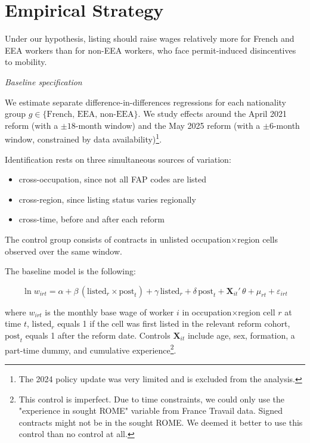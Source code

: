 \documentclass[10pt, a4paper]{article}
\begin{document}
\section{Empirical Strategy}
\medskip

Under our hypothesis, listing should raise wages relatively more for French and EEA workers than for non-EEA workers, who face permit-induced disincentives to mobility.
\medskip

\noindent \textit{Baseline specification}

\noindent We estimate separate difference-in-differences regressions for each nationality group $g \in \{\text{French, EEA, non-EEA}\}$. We study effects around the April 2021 reform (with a $\pm 18$-month window) and the May 2025 reform (with a $\pm 6$-month window, constrained by data availability)\footnote{The 2024 policy update was very limited and is excluded from the analysis.}.

\noindent Identification rests on three simultaneous sources of variation: 
\begin{itemize}
    \item cross-occupation, since not all FAP codes are listed
    \item cross-region, since listing status varies regionally
    \item cross-time, before and after each reform
\end{itemize}
The control group consists of contracts in unlisted occupation$\times$region cells observed over the same window. 

\noindent The baseline model is the following:

\begin{equation}
\ln w_{irt} = \alpha + \beta \,(\text{listed}_{r} \times \text{post}_{t})
  + \gamma \,\text{listed}_{r} + \delta \,\text{post}_{t}
  + \mathbf{X}_{it}'\,\theta + \mu_{rt} + \varepsilon_{irt}
\label{eq:did}
\end{equation}

\noindent where $w_{irt}$ is the monthly base wage of worker $i$ in
occupation$\times$region cell $r$ at time $t$, $\text{listed}_{r}$ equals 1 if the cell was first listed in the relevant reform cohort,
$\text{post}_{t}$ equals 1 after the reform date. Controls $\mathbf{X}_{it}$ include age, sex, formation, a part-time dummy, and cumulative experience\footnote{This control is imperfect. Due to time constraints, we could only use the "experience in sought ROME" variable from France Travail data. Signed contracts might not be in the sought ROME. We deemed it better to use this control than no control at all.}. 
\end{document}
